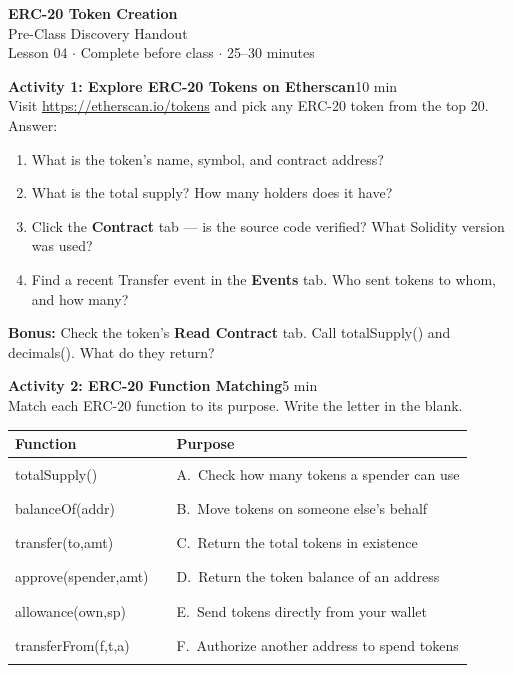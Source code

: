 \documentclass[11pt,a4paper]{article}
\newcommand{\activitybox}[3]{%
  \noindent\colorbox{mllavender4}{\parbox{\dimexpr\linewidth-2\fboxsep}{%
    \textbf{\color{mlpurple}#1}\hfill\textcolor{mlgray}{\small #2}\\[2pt]#3%
  }}\par\vspace{4pt}%
}
\newcommand{\fillcell}{\rule{2.2cm}{0.3pt}}
\begin{document}
\begin{center}
{\LARGE\color{mlpurple}\textbf{ERC-20 Token Creation}}\\[4pt]
{\large\color{mlblue}Pre-Class Discovery Handout}\\[2pt]
{\small\color{mlgray}Lesson 04 $\cdot$ Complete before class $\cdot$ 25--30 minutes}
\end{center}
\vspace{4pt}

\activitybox{Activity 1: Explore ERC-20 Tokens on Etherscan}{10 min}{%
Visit \url{https://etherscan.io/tokens} and pick any ERC-20 token from the top 20. Answer:
\begin{enumerate}
\item What is the token's name, symbol, and contract address?
\item What is the total supply? How many holders does it have?
\item Click the \textbf{Contract} tab --- is the source code verified? What Solidity version was used?
\item Find a recent Transfer event in the \textbf{Events} tab. Who sent tokens to whom, and how many?
\end{enumerate}
\textbf{Bonus:} Check the token's \textbf{Read Contract} tab. Call {\ttfamily\small totalSupply()} and {\ttfamily\small decimals()}. What do they return?
}

\vspace{2pt}

\activitybox{Activity 2: ERC-20 Function Matching}{5 min}{%
Match each ERC-20 function to its purpose. Write the letter in the blank.
\begin{center}
\renewcommand{\arraystretch}{1.3}
\begin{tabular}{@{}lcp{7.2cm}@{}}
\toprule
\textbf{Function} & \textbf{} & \textbf{Purpose} \\
\midrule
{\ttfamily\small totalSupply()}         & \fillcell & A.\ Check how many tokens a spender can use \\
{\ttfamily\small balanceOf(addr)}       & \fillcell & B.\ Move tokens on someone else's behalf \\
{\ttfamily\small transfer(to,amt)}      & \fillcell & C.\ Return the total tokens in existence \\
{\ttfamily\small approve(spender,amt)}  & \fillcell & D.\ Return the token balance of an address \\
{\ttfamily\small allowance(own,sp)}     & \fillcell & E.\ Send tokens directly from your wallet \\
{\ttfamily\small transferFrom(f,t,a)}   & \fillcell & F.\ Authorize another address to spend tokens \\
\bottomrule
\end{tabular}
\end{center}
}
\end{document}
